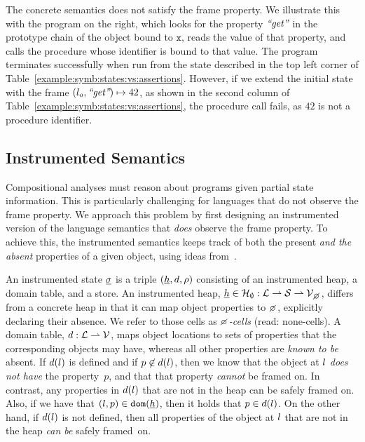 \smallskip
{}
The \jsil concrete semantics does not satisfy the frame property. 
We illustrate this with the program on the right, which 
looks for the property $\text{{\it ``get''}}$ in the 
prototype chain of the object bound to $\mathtt{x}$, reads the value of that 
property, and calls the procedure whose identifier is bound to that value. 
The program terminates successfully when run from the state 
described in the top left corner of Table~\ref{example:symb:states:vs:assertions}. However, if we extend the initial state with the frame $(l_o, \text{{\it ``get''}}) \mapsto 42$, 
as shown in the second column of Table~\ref{example:symb:states:vs:assertions}, the procedure 
call fails, as $42$ is not a procedure identifier. 

\vspace*{-0.2cm}
\subsection{\jsil Instrumented Semantics}\label{subsec:instrumented}



Compositional analyses must reason about programs given partial state information.
This is particularly challenging for languages that do not observe the frame property.
We approach this problem by first designing an instrumented version of the language semantics that \emph{does} 
observe the frame property. 
%
To achieve this, the \jsil instrumented semantics keeps track of both the present \emph{and the absent} properties of a given object, 
using ideas from~\cite{gardner:popl:2012,javert}.

An instrumented state $\underline{\sigma}$ is a triple $(\underline{h}, d, \rho)$ consisting of an instrumented heap, 
a domain table, and a store. 
%
An instrumented heap, $\iheap \in \iheaps : \locs \partialmap \strings \partialmap \setext{\vals}{\none}$, 
differs from a concrete heap in that it can map object properties to $\none$, explicitly declaring their absence. 
We refer to those cells as \emph{$\none$-cells} (read: none-cells). 
%
A domain table, $d : {\mathcal L} \rightharpoonup \mathcal{V}$, maps object locations to sets of properties that the corresponding objects may have, whereas all other properties are \emph{known to be} absent. If $d(l)$ is defined and if $p \not\in d(l)$, then we know that the object at $l$ \emph{does not have} the property~$p$, and that that property \emph{cannot} be framed on. In contrast, any properties in $d(l)$ that are not in the heap can be safely framed on. Also, if we have that $(l, p) \in \texttt{dom}(\underline{h})$, then it holds that $p \in d(l)$.
On the other hand, if $d(l)$ is not defined, then all properties of the object at $l$ that are not in the heap \emph{can be} safely framed~on.


